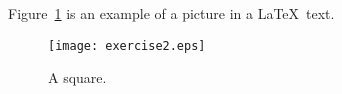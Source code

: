 \documentclass{article}
\begin{document}
Figure~\ref{fig:square} is an example of a picture in a \LaTeX\ text.
\begin{figure}[hbt]
\begin{center}
\texttt{[image: exercise2.eps]}
\caption{A square.}
\label{fig:square}
\end{center}
\end{figure}
\end{document}
